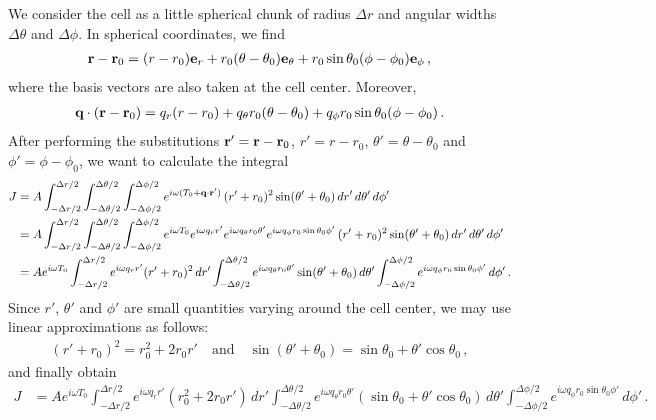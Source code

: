 We consider the cell as a little spherical chunk of radius $\Delta r$ and angular widths $\Delta\theta$ and $\Delta\phi$. In spherical coordinates, we find
%
\begin{align}
   \textbf r-\textbf r_0 = (r-r_0)\textbf e_r+r_0(\theta-\theta_0)\textbf e_{\theta}+r_0\sin\theta_0(\phi-\phi_0)\textbf e_{\phi} \,,
\end{align}
%
where the basis vectors are also taken at the cell center. Moreover,
%
\begin{align}
   \textbf q\cdot(\textbf r-\textbf r_0) = q_r(r-r_0)+q_{\theta}r_0(\theta-\theta_0)+q_{\phi}r_0\sin\theta_0(\phi-\phi_0) \,.
\end{align}
%
After performing the substitutions $\textbf r'=\textbf r-\textbf r_0$, $r'= r-r_0$, $\theta'=\theta-\theta_0$ and $\phi'=\phi-\phi_0$, we want to calculate the integral
%
\begin{align}
   J &= A\int_{-\Delta r/2}^{\Delta r/2}\int_{-\Delta \theta/2}^{\Delta \theta/2}\int_{-\Delta \phi/2}^{\Delta \phi/2}
       e^{i\omega(T_0+\textbf q\cdot\textbf r')}\,(r'+r_0)^2\sin(\theta'+\theta_0)\,dr'\,d\theta'\,d\phi' \notag \\
   &= A\int_{-\Delta r/2}^{\Delta r/2}\int_{-\Delta \theta/2}^{\Delta \theta/2}\int_{-\Delta \phi/2}^{\Delta \phi/2}
       e^{i\omega T_0}e^{i\omega q_r r'}e^{i\omega q_\theta r_0\theta'}e^{i\omega q_\phi r_0\sin\theta_0\phi'}\,
       (r'+r_0)^2\sin(\theta'+\theta_0)\,dr'\,d\theta'\,d\phi' \notag \\
   &= Ae^{i\omega T_0}\int_{-\Delta r/2}^{\Delta r/2}e^{i\omega q_r r'}(r'+r_0)^{2}\,dr'
      \int_{-\Delta \theta/2}^{\Delta \theta/2}e^{i\omega q_\theta r_0\theta'}\sin(\theta'+\theta_0)\,d\theta'
      \int_{-\Delta \phi/2}^{\Delta \phi/2} e^{i\omega q_\phi r_0\sin\theta_0\phi'}\,d\phi'\,.
\end{align}
%
Since $r'$, $\theta'$ and $\phi'$ are small quantities varying around the cell center, we may use linear approximations as follows:
%
\begin{align}
(r'+r_0)^2 = r_0^2+2r_0 r' \quad\mathrm{and}\quad \sin(\theta'+\theta_0) = \sin\theta_0+\theta'\cos\theta_0 \,,
\end{align}
%
and finally obtain
%
\begin{align}
   J &= Ae^{i\omega T_0}\int_{-\Delta r/2}^{\Delta r/2}e^{i\omega q_r r'}(r_0^2+2r_0 r')\,dr'
      \int_{-\Delta \theta/2}^{\Delta \theta/2}e^{i\omega q_\theta r_0\theta'}(\sin\theta_0+\theta'\cos\theta_0)\,d\theta'
      \int_{-\Delta \phi/2}^{\Delta \phi/2} e^{i\omega q_\phi r_0\sin\theta_0\phi'}\,d\phi'\,.
\end{align}
